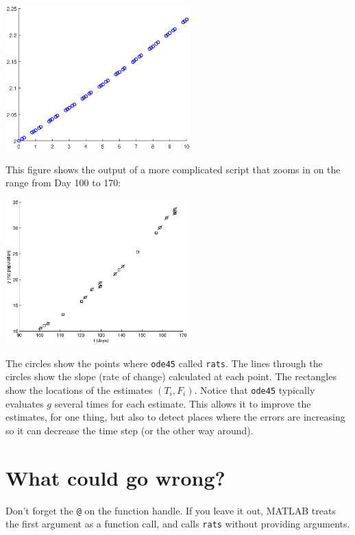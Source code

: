 \documentclass[
]{book}
\begin{document}
\beforefig \centerline{\includegraphics[height=2.2in]{figs/ode45_simple.eps}}

This figure shows the output of a more complicated script that zooms
in on the range from Day 100 to 170:

\beforefig \centerline{\includegraphics[height=2.2in]{figs/ode45.eps}}

The circles show the points where {\tt ode45} called {\tt rats}.
The lines through the circles show the slope (rate of change) calculated
at each point.  The rectangles show the locations of the estimates
$(T_i, F_i)$.  Notice that {\tt ode45} typically evaluates
$g$ several times for each estimate.  This allows it to improve the
estimates, for one thing, but also to detect places where the errors
are increasing so it can decrease the time step (or the other
way around).


\section{What could go wrong?}

Don't forget the {\tt @} on the function handle.
If you leave it out, MATLAB treats the first argument as a function
call, and calls {\tt rats} without providing arguments.
\end{document}
